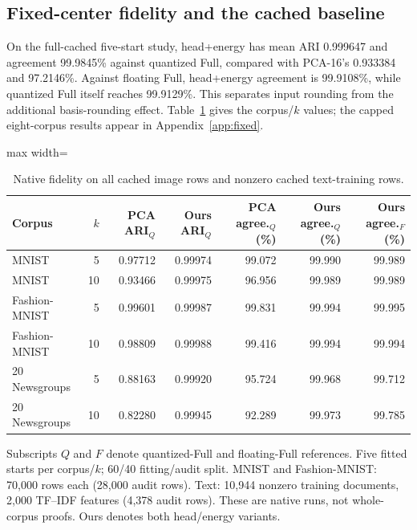 \documentclass[5p,times,twocolumn]{elsarticle}
\theoremstyle{plain}
\theoremstyle{definition}
\theoremstyle{remark}
\begin{document}
\par\endgroup
\subsection{\textcolor{RevisionGreen}{Fixed-center fidelity and the cached baseline}}\label{sec:results}
\begingroup\color{RevisionGreen}
On the full-cached five-start study, head+energy has mean ARI 0.999647 and agreement 99.9845\% against quantized Full, compared with PCA-16's 0.933384 and 97.2146\%. Against floating Full, head+energy agreement is 99.9108\%, while quantized Full itself reaches 99.9129\%. This separates input rounding from the additional basis-rounding effect. Table~\ref{tab:full-accuracy} gives the corpus/$k$ values; the capped eight-corpus results appear in Appendix~\ref{app:fixed}.


\par\endgroup
\begingroup\color{RevisionGreen}
\begin{table}[tp]\color{RevisionGreen}
\caption{Native fidelity on all cached image rows and nonzero cached text-training rows.}\label{tab:full-accuracy}
\centering\small
\begin{adjustbox}{max width=\textwidth}
\begin{tabular}{@{}lrrrrrr@{}}
\toprule
Corpus & $k$ & PCA ARI$_Q$ & Ours ARI$_Q$ & PCA agree.$_Q$ (\%) & Ours agree.$_Q$ (\%) & Ours agree.$_F$ (\%) \\
\midrule
MNIST & 5 & 0.97712 & 0.99974 & 99.072 & 99.990 & 99.989 \\
MNIST & 10 & 0.93466 & 0.99975 & 96.956 & 99.989 & 99.989 \\
Fashion-MNIST & 5 & 0.99601 & 0.99987 & 99.831 & 99.994 & 99.995 \\
Fashion-MNIST & 10 & 0.98809 & 0.99988 & 99.416 & 99.994 & 99.994 \\
20 Newsgroups & 5 & 0.88163 & 0.99920 & 95.724 & 99.968 & 99.712 \\
20 Newsgroups & 10 & 0.82280 & 0.99945 & 92.289 & 99.973 & 99.785 \\
\bottomrule
\end{tabular}
\end{adjustbox}
\par\vspace{3pt}\begin{minipage}{0.98\textwidth}\footnotesize Subscripts $Q$ and $F$ denote quantized-Full and floating-Full references. Five fitted starts per corpus/$k$; 60/40 fitting/audit split. MNIST and Fashion-MNIST: 70,000 rows each (28,000 audit rows). Text: 10,944 nonzero training documents, 2,000 TF--IDF features (4,378 audit rows). These are native runs, not whole-corpus proofs. Ours denotes both head/energy variants.\end{minipage}
\end{table}
\end{document}
